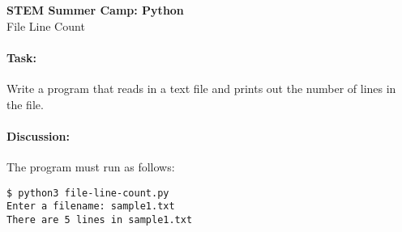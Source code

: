 \documentclass[11pt]{article}
\begin{document}
    \begin{center}

        \large\textbf{STEM Summer Camp: Python} \\
        File Line Count \\

    \end{center}

    \paragraph{Task:} Write a program that reads in a text file and
    prints out the number of lines in the file.  
    
    \paragraph{Discussion:} The program must run as follows:
    
    \vspace{1.5em}

\begin{verbatim}
$ python3 file-line-count.py
Enter a filename: sample1.txt
There are 5 lines in sample1.txt
\end{verbatim}
\end{document}
